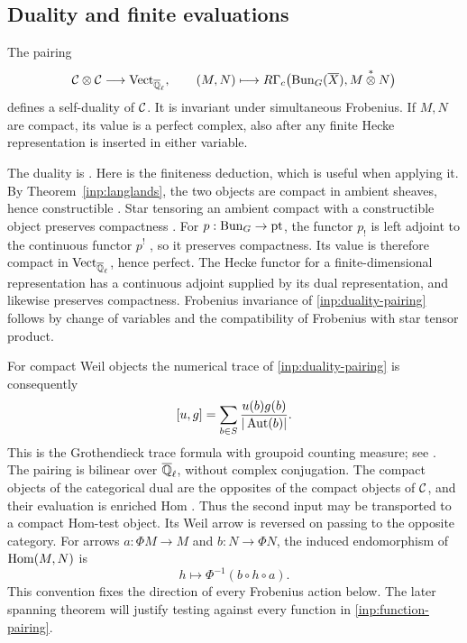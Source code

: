 \subsection{Duality and finite evaluations}

\begin{theorem}\label{inp:duality}
The pairing
\begin{equation}\label{inp:duality-pairing}
 \mathcal C\otimes\mathcal C\longrightarrow\operatorname{Vect}_{\overline{\mathbb Q}_{\ell}},\qquad
 (M,N)\longmapsto
 R\Gamma_c\bigl(\operatorname{Bun}_G(\overline X),M\overset{*}{\otimes}N\bigr)
\end{equation}
defines a self-duality of $\mathcal C$.  It is invariant under simultaneous
Frobenius.  If $M,N$ are compact, its value is a perfect complex, also
after any finite Hecke representation is inserted in either variable.
\end{theorem}

The duality is \cite[Theorem~3.2.2]{AGKRRV2}.
Here is the finiteness deduction, which is useful when applying it.
By Theorem~\ref{inp:langlands}, the two objects are compact in ambient
sheaves, hence constructible \cite[Appendix~A.1.6]{AGKRRV2}.
Star tensoring an ambient compact with a constructible object
preserves compactness \cite[Appendix~A.1.6]{AGKRRV2}.
For $p:\operatorname{Bun}_G\to\operatorname{pt}$, the functor $p_!$ is left adjoint
to the continuous functor $p^!$ \cite[Appendix~A.1.7]{AGKRRV2}, so it
preserves compactness.  Its value is therefore compact in
$\operatorname{Vect}_{\overline{\mathbb Q}_{\ell}}$, hence perfect.
The Hecke functor for a finite-dimensional representation has a
continuous adjoint supplied by its dual representation, and likewise
preserves compactness.  Frobenius invariance of
\eqref{inp:duality-pairing} follows by change of variables and the
compatibility of Frobenius with star tensor product.

For compact Weil objects the numerical trace of
\eqref{inp:duality-pairing} is consequently
\begin{equation}\label{inp:function-pairing}
 [u,g]=\sum_{b\in S}\frac{u(b)g(b)}{|\operatorname{Aut}(b)|}.
\end{equation}
This is the Grothendieck trace formula with groupoid counting measure;
see \cite[\S\S1.1.9 and~1.2.3]{GLR}.
The pairing is bilinear over $\overline{\mathbb Q}_{\ell}$, without complex conjugation.
The compact objects of the categorical dual are the opposites of the
compact objects of $\mathcal C$, and their evaluation is enriched Hom
\cite[\S\S0.5.3 and~5.1.2]{AGKRRV2}.
Thus the second input may be transported to a compact Hom-test object.
Its Weil arrow is reversed on passing to the opposite category.  For
arrows $a:\Phi M\to M$ and $b:N\to\Phi N$, the induced endomorphism of
$\operatorname{Hom}(M,N)$ is
\begin{equation}\label{inp:hom-action}
 h\longmapsto\Phi^{-1}(b\circ h\circ a).
\end{equation}
This convention fixes the direction of every Frobenius action below.
The later spanning theorem will justify testing against every function
in \eqref{inp:function-pairing}.

